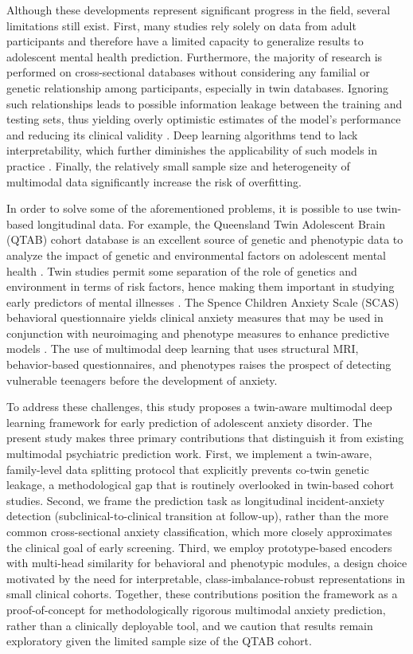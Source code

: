 \documentclass[10pt,letterpaper]{article}
\begin{document}
        Although these developments represent significant progress in the field, several limitations still exist. First, many studies rely solely on data from adult participants and therefore have a limited capacity to generalize results to adolescent mental health prediction. Furthermore, the majority of research is performed on cross-sectional databases without considering any familial or genetic relationship among participants, especially in twin databases. Ignoring such relationships leads to possible information leakage between the training and testing sets, thus yielding overly optimistic estimates of the model's performance and reducing its clinical validity \cite{ref32,ref33,ref34}. Deep learning algorithms tend to lack interpretability, which further diminishes the applicability of such models in practice \cite{ref15,ref16}. Finally, the relatively small sample size and heterogeneity of multimodal data significantly increase the risk of overfitting.



        In order to solve some of the aforementioned problems, it is possible to use twin-based longitudinal data. For example, the Queensland Twin Adolescent Brain (QTAB) cohort database is an excellent source of genetic and phenotypic data to analyze the impact of genetic and environmental factors on adolescent mental health \cite{ref32}. Twin studies permit some separation of the role of genetics and environment in terms of risk factors, hence making them important in studying early predictors of mental illnesses \cite{ref33,ref34}. The Spence Children Anxiety Scale (SCAS) behavioral questionnaire yields clinical anxiety measures that may be used in conjunction with neuroimaging and phenotype measures to enhance predictive models \cite{ref35}. The use of multimodal deep learning that uses structural MRI, behavior-based questionnaires, and phenotypes raises the prospect of detecting vulnerable teenagers before the development of anxiety.

        To address these challenges, this study proposes a twin-aware multimodal deep learning framework for early prediction of adolescent anxiety disorder. The present study makes three primary contributions that distinguish it from existing multimodal psychiatric prediction work. First, we implement a twin-aware, family-level data splitting protocol that explicitly prevents co-twin genetic leakage, a methodological gap that is routinely overlooked in twin-based cohort studies. Second, we frame the prediction task as longitudinal incident-anxiety detection (subclinical-to-clinical transition at follow-up), rather than the more common cross-sectional anxiety classification, which more closely approximates the clinical goal of early screening. Third, we employ prototype-based encoders with multi-head similarity for behavioral and phenotypic modules, a design choice motivated by the need for interpretable, class-imbalance-robust representations in small clinical cohorts. Together, these contributions position the framework as a proof-of-concept for methodologically rigorous multimodal anxiety prediction, rather than a clinically deployable tool, and we caution that results remain exploratory given the limited sample size of the QTAB cohort.
\end{document}

